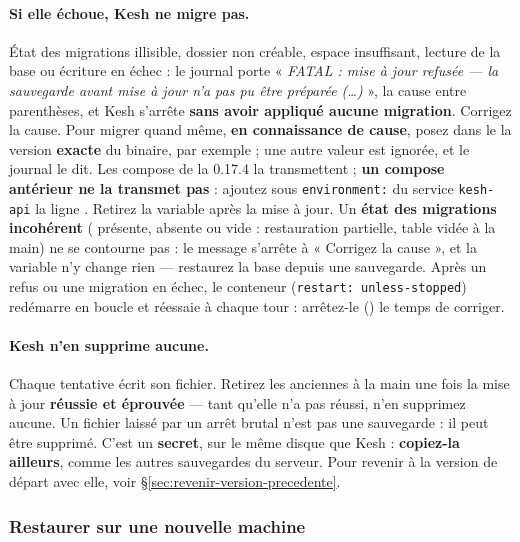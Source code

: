 \documentclass[a4paper,11pt,oneside]{article}
\begin{document}
\paragraph{Si elle échoue, Kesh ne migre pas.} État des migrations illisible, dossier non créable, espace insuffisant, lecture de la base ou écriture en échec : le journal porte « \emph{FATAL : mise à jour refusée --- la sauvegarde avant mise à jour n'a pas pu être préparée (…)} », la cause entre parenthèses, et Kesh s'arrête \textbf{sans avoir appliqué aucune migration}. Corrigez la cause. Pour migrer quand même, \textbf{en connaissance de cause}, posez dans le  la version \textbf{exacte} du binaire, par exemple  ; une autre valeur est ignorée, et le journal le dit. Les compose de la 0.17.4 la transmettent ; \textbf{un compose antérieur ne la transmet pas} : ajoutez sous \texttt{environment:} du service \texttt{kesh-api} la ligne . Retirez la variable après la mise à jour. Un \textbf{état des migrations incohérent} ( présente,  absente ou vide : restauration partielle, table vidée à la main) ne se contourne pas : le message s'arrête à « Corrigez la cause », et la variable n'y change rien --- restaurez la base depuis une sauvegarde. Après un refus ou une migration en échec, le conteneur (\texttt{restart: unless-stopped}) redémarre en boucle et réessaie à chaque tour : arrêtez-le () le temps de corriger.

\paragraph{Kesh n'en supprime aucune.} Chaque tentative écrit son fichier. Retirez les anciennes à la main une fois la mise à jour \textbf{réussie et éprouvée} --- tant qu'elle n'a pas réussi, n'en supprimez aucune. Un fichier  laissé par un arrêt brutal n'est pas une sauvegarde : il peut être supprimé. C'est un \textbf{secret}, sur le même disque que Kesh : \textbf{copiez-la ailleurs}, comme les autres sauvegardes du serveur. Pour revenir à la version de départ avec elle, voir \S\ref{sec:revenir-version-precedente}.

\subsubsection{Restaurer sur une nouvelle machine}\label{sec:restauration-machine-neuve}
\end{document}
